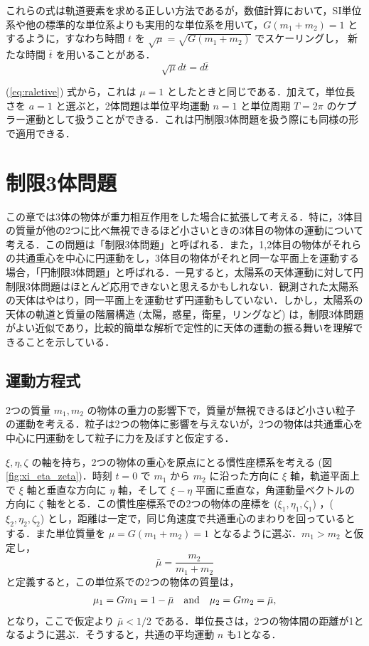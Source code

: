 \documentclass[11pt,a4paper,oneside,onecolumn]{jreport}
\begin{document}
これらの式は軌道要素を求める正しい方法であるが，数値計算において，SI単位系や他の標準的な単位系よりも実用的な単位系を用いて，$G (m_1 + m_2) = 1$ とするように，すなわち時間 $t$ を $\sqrt{\mu} = \sqrt{G (m_1 + m_2)}$ でスケーリングし， 新たな時間 $\bar{t}$ を用いることがある．
\begin{equation}
\sqrt{\mu} dt = d \bar{t} \label{eq:tbar}
\end{equation}

(\ref{eq:raletive}) 式から，これは $\mu = 1$ としたときと同じである．加えて，単位長さを $a = 1$ と選ぶと，2体問題は単位平均運動 $n = 1$ と単位周期 $T = 2 \pi$ のケプラー運動として扱うことができる．これは円制限3体問題を扱う際にも同様の形で適用できる．


\section{制限3体問題 \label{sec:3body}}
この章では3体の物体が重力相互作用をした場合に拡張して考える．特に，3体目の質量が他の2つに比べ無視できるほど小さいときの3体目の物体の運動について考える．この問題は「制限3体問題」と呼ばれる．また，1,2体目の物体がそれらの共通重心を中心に円運動をし，3体目の物体がそれと同一な平面上を運動する場合，「円制限3体問題」と呼ばれる．一見すると，太陽系の天体運動に対して円制限3体問題はほとんど応用できないと思えるかもしれない．観測された太陽系の天体はやはり，同一平面上を運動せず円運動もしていない．しかし，太陽系の天体の軌道と質量の階層構造 (太陽，惑星，衛星，リングなど) は，制限3体問題がよい近似であり，比較的簡単な解析で定性的に天体の運動の振る舞いを理解できることを示している．

\subsection{運動方程式}
2つの質量 $m_1, m_2$ の物体の重力の影響下で，質量が無視できるほど小さい粒子の運動を考える．粒子は2つの物体に影響を与えないが，2つの物体は共通重心を中心に円運動をして粒子に力を及ぼすと仮定する．

$\xi, \eta, \zeta$ の軸を持ち，2つの物体の重心を原点にとる慣性座標系を考える (図 \ref{fig:xi_eta_zeta})．時刻 $t = 0$ で $m_1$ から $m_2$ に沿った方向に $\xi$ 軸，軌道平面上で $\xi$ 軸と垂直な方向に $\eta$ 軸，そして $\xi - \eta$ 平面に垂直な，角運動量ベクトルの方向に $\zeta$ 軸をとる．この慣性座標系での2つの物体の座標を ($\xi_1, \eta_1, \zeta_1$) ，($\xi_2, \eta_2, \zeta_2$) とし，距離は一定で，同じ角速度で共通重心のまわりを回っているとする．また単位質量を $\mu = G (m_1 + m_2) = 1$ となるように選ぶ．$m_1 > m_2$ と仮定し，
\begin{equation}
\bar{\mu} = \frac{m_2}{m_1 + m_2}
\end{equation}
と定義すると，この単位系での2つの物体の質量は，
\begin{equation}
\mu_1 = G m_1 = 1 - \bar{\mu} \quad {\rm and} \quad \mu_2 = G m_2 = \bar{\mu}, \label{eq:mu1mu2}
\end{equation}
となり，ここで仮定より $\bar{\mu} < 1/2$ である．単位長さは，2つの物体間の距離が1となるように選ぶ．そうすると，共通の平均運動 $n$ も1となる．
\end{document}
